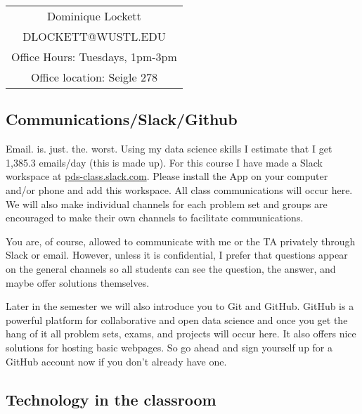 \documentclass[11pt]{article}
\begin{document}
\begin{center}
\begin{small}
\begin{tabular}{c}
Dominique Lockett \\
DLOCKETT@WUSTL.EDU\\
Office Hours: Tuesdays, 1pm-3pm\\
Office location: Seigle 278
\end{tabular}
\end{small}
\end{center}

\subsection*{Communications/Slack/Github}

Email. is. just. the. worst.  Using my data science skills I estimate that I get 1,385.3 emails/day (this is made up). For this course I have made a Slack workspace at \url{pds-class.slack.com}.  Please install the App on your computer and/or phone and add this workspace.  All class communications will occur here. We will also make individual channels for each problem set and groups are encouraged to make their own channels to facilitate communications.  

You are, of course, allowed to communicate with me or the TA privately through Slack or email.  However, unless it is confidential, I prefer that questions appear on the general channels so all students can see the question, the answer, and maybe offer solutions themselves.

Later in the semester we will also introduce you to Git and GitHub.  GitHub is a powerful platform for collaborative and open data science and once you get the hang of it all problem sets, exams, and projects will occur here.  It also offers nice solutions for hosting basic webpages.  So go ahead and sign yourself up for a GitHub account now if you don't already have one.



\subsection*{Technology in the classroom}
\end{document}
